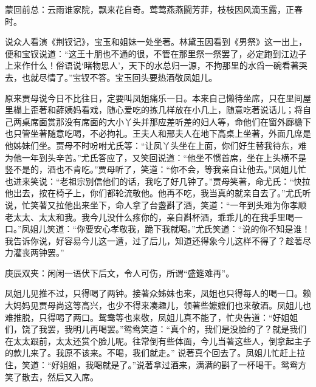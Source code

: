 

\begin{parag}
    \begin{note}蒙回前总：云雨谁家院，飘来花自奇。莺莺燕燕闘芳菲，枝枝因风滴玉露，正春时。\end{note}
\end{parag}


\begin{parag}
    说众人看演《荆钗记》，宝玉和姐妹一处坐著。林黛玉因看到《男祭》这一出上，便和宝钗说道：“这王十朋也不通的很，不管在那里祭一祭罢了，必定跑到江边子上来作什么！俗语说‘睹物思人’，天下的水总归一源，不拘那里的水舀一碗看著哭去，也就尽情了。”宝钗不答。宝玉回头要热酒敬凤姐儿。
\end{parag}


\begin{parag}
    原来贾母说今日不比往日，定要叫凤姐痛乐一日。本来自己懒待坐席，只在里间屋里榻上歪著和薛姨妈看戏，随心爱吃的拣几样放在小几上，随意吃著说话儿；将自己两桌席面赏那没有席面的大小丫头并那应差听差的妇人等，命他们在窗外廊檐下也只管坐著随意吃喝，不必拘礼。王夫人和邢夫人在地下高桌上坐著，外面几席是他姊妹们坐。贾母不时吩咐尤氏等：“让凤丫头坐在上面，你们好生替我待东，难为他一年到头辛苦。”尤氏答应了，又笑回说道：“他坐不惯首席，坐在上头横不是竖不是的，酒也不肯吃。”贾母听了，笑道：“你不会，等我亲自让他去。”凤姐儿忙也进来笑说：“老祖宗别信他们的话，我吃了好几钟了。”贾母笑著，命尤氏：“快拉他出去，按在椅子上，你们都轮流敬他。他再不吃，我当真的就亲自去了。”尤氏听说，忙笑著又拉他出来坐下，命人拿了台盏斟了酒，笑道：“一年到头难为你孝顺老太太、太太和我。我今儿没什么疼你的，亲自斟杯酒，乖乖儿的在我手里喝一口。”凤姐儿笑道：“你要安心孝敬我，跪下我就喝。”尤氏笑道：“说的你不知是谁！我告诉你说，好容易今儿这一遭，过了后儿，知道还得象今儿这样不得了？趁著尽力灌丧两钟罢。”\begin{note}庚辰双夹：闲闲一语伏下后文，令人可伤，所谓“盛筵难再”。\end{note}凤姐儿见推不过，只得喝了两钟。接著众姊妹也来，凤姐也只得每人的喝一口。赖大妈妈见贾母尚这等高兴，也少不得来凑趣儿，领著些嬷嬷们也来敬酒。凤姐儿也难推脱，只得喝了两口。鸳鸯等也来敬，凤姐儿真不能了，忙央告道：“好姐姐们，饶了我罢，我明儿再喝罢。”鸳鸯笑道：“真个的，我们是没脸的了？就是我们在太太跟前，太太还赏个脸儿呢。往常倒有些体面，今儿当著这些人，倒拿起主子的款儿来了。我原不该来。不喝，我们就走。” 说著真个回去了。凤姐儿忙赶上拉住，笑道：“好姐姐，我喝就是了。”说著拿过酒来，满满的斟了一杯喝干。鸳鸯方笑了散去，然后又入席。
\end{parag}


